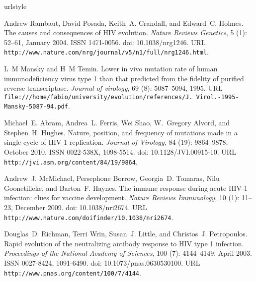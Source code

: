 \documentclass[11pt]{article}
\begin{document}
%
%

\begin{thebibliography}{48}
\providecommand{\natexlab}[1]{#1}
\providecommand{\url}[1]{\texttt{#1}}
\expandafter\ifx\csname urlstyle\endcsname\relax
  \providecommand{\doi}[1]{doi: #1}\else
  \providecommand{\doi}{doi: \begingroup \urlstyle{rm}\Url}\fi

Andrew Rambaut, David Posada, Keith~A. Crandall, and Edward~C. Holmes.
\newblock The causes and consequences of {HIV} evolution.
\newblock \emph{Nature Reviews Genetics}, 5 (1): 52--61,
  January 2004.
\newblock ISSN 1471-0056.
\newblock \doi{10.1038/nrg1246}.
\newblock URL \url{http://www.nature.com/nrg/journal/v5/n1/full/nrg1246.html}.

L~M Mansky and H~M Temin.
\newblock Lower in vivo mutation rate of human immunodeficiency virus type 1
  than that predicted from the fidelity of purified reverse transcriptase.
\newblock \emph{Journal of virology}, 69 (8): 5087--5094,
  1995.
\newblock URL \url{file:///home/fabio/university/evolution/references/J.
  Virol.-1995-Mansky-5087-94.pdf}.

Michael~E. Abram, Andrea~L. Ferris, Wei Shao, W.~Gregory Alvord, and Stephen~H.
  Hughes.
\newblock Nature, position, and frequency of mutations made in a single cycle
  of {HIV-1} replication.
\newblock \emph{Journal of Virology}, 84 (19): 9864--9878,
  October 2010.
\newblock ISSN 0022-{538X}, 1098-5514.
\newblock \doi{10.1128/JVI.00915-10}.
\newblock URL \url{http://jvi.asm.org/content/84/19/9864}.

Andrew~J. {McMichael}, Persephone Borrow, Georgia~D. Tomaras, Nilu
  Goonetilleke, and Barton~F. Haynes.
\newblock The immune response during acute {HIV-1} infection: clues for vaccine
  development.
\newblock \emph{Nature Reviews Immunology}, 10 (1): 11--23,
  December 2009.
\newblock \doi{10.1038/nri2674}.
\newblock URL \url{http://www.nature.com/doifinder/10.1038/nri2674}.

Douglas~D. Richman, Terri Wrin, Susan~J. Little, and Christos~J. Petropoulos.
\newblock Rapid evolution of the neutralizing antibody response to {HIV} type 1
  infection.
\newblock \emph{Proceedings of the National Academy of Sciences}, 100
  (7): 4144--4149, April 2003.
\newblock ISSN 0027-8424, 1091-6490.
\newblock \doi{10.1073/pnas.0630530100}.
\newblock URL \url{http://www.pnas.org/content/100/7/4144}.


\end{thebibliography}
\end{document}
